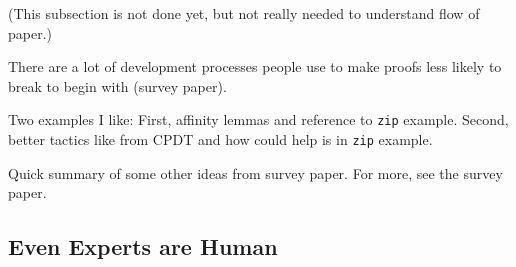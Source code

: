 (This subsection is not done yet, but not really needed to understand flow of paper.)

There are a lot of development processes people use to make proofs less likely to break to begin with (survey paper).

Two examples I like: First, affinity lemmas and reference to \lstinline{zip} example.
Second, better tactics like from CPDT and how could help is in \lstinline{zip} example.

Quick summary of some other ideas from survey paper.
For more, see the survey paper.

\subsection{Even Experts are Human}
\label{sec:irl}


